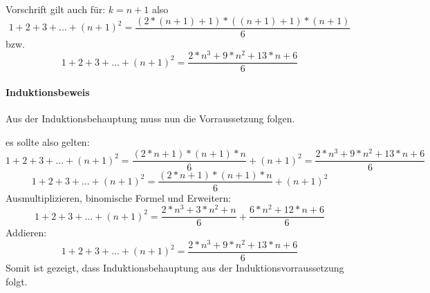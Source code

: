 \documentclass{article}
\begin{document}
Vorschrift gilt auch für: $k=n+1$ also \[1+2+3+...+(n+1)^2 = \frac{(2*(n+1)+1)*((n+1)+1)*(n+1)}{6} \]
bzw.
\[1+2+3+...+(n+1)^2 = \frac{2*n^3+9*n^2+13*n+6}{6} \]
\clearpage
\paragraph{Induktionsbeweis}\mbox{}

Aus der Induktionsbehauptung muss nun die Vorraussetzung folgen.

es sollte also gelten: \[1+2+3+...+(n+1)^2 = \frac{(2*n+1)*(n+1)*n}{6} + (n+1)^2= \frac{2*n^3+9*n^2+13*n+6}{6}\]
\[1+2+3+...+(n+1)^2 = \frac{(2*n+1)*(n+1)*n}{6}+(n+1)^2 \]
Ausmultiplizieren, binomische Formel und Erweitern:
\[1+2+3+...+(n+1)^2 = \frac{2*n^3+3*n^2+n}{6}+\frac{6*n^2+12*n+6}{6} \]
Addieren:
\[1+2+3+...+(n+1)^2 =  \frac{2*n^3+9*n^2+13*n+6}{6} \]
\newline
Somit ist gezeigt, dass Induktionsbehauptung aus der Induktionsvorraussetzung folgt.
\end{document}
